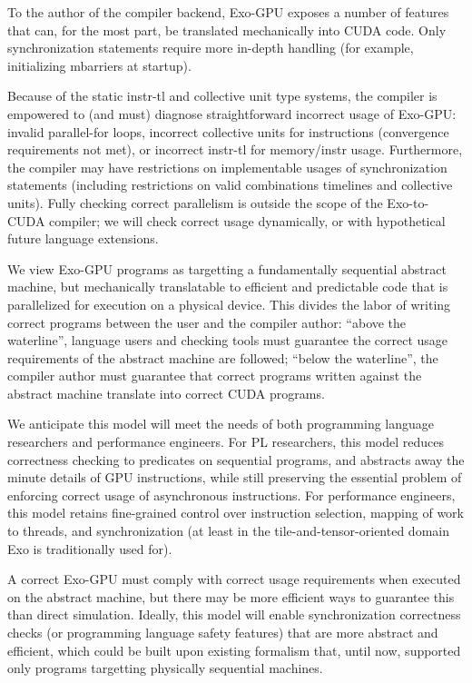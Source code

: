 \filbreak
{}

To the author of the compiler backend, Exo-GPU exposes a number of features that can, for the most part, be translated mechanically into CUDA code.
Only synchronization statements require more in-depth handling (for example, initializing mbarriers at startup).

\filbreak
Because of the static instr-tl and collective unit type systems, the compiler is empowered to (and must) diagnose straightforward incorrect usage of Exo-GPU: invalid parallel-for loops, incorrect collective units for instructions (convergence requirements not met), or incorrect instr-tl for memory/instr usage.
Furthermore, the compiler may have restrictions on implementable usages of synchronization statements (including restrictions on valid combinations timelines and collective units).
Fully checking correct parallelism is outside the scope of the Exo-to-CUDA compiler; we will check correct usage dynamically, or with hypothetical future language extensions.

\filbreak
{}

We view Exo-GPU programs as targetting a fundamentally sequential abstract machine, but mechanically translatable to efficient and predictable code that is parallelized for execution on a physical device.
This divides the labor of writing correct programs between the user and the compiler author: ``above the waterline'', language users and checking tools must guarantee the correct usage requirements of the abstract machine are followed; ``below the waterline'', the compiler author must guarantee that correct programs written against the abstract machine translate into correct CUDA programs.

\filbreak
We anticipate this model will meet the needs of both programming language researchers and performance engineers.
For PL researchers, this model reduces correctness checking to predicates on sequential programs, and abstracts away the minute details of GPU instructions, while still preserving the essential problem of enforcing correct usage of asynchronous instructions.
For performance engineers, this model retains fine-grained control over instruction selection, mapping of work to threads, and synchronization (at least in the tile-and-tensor-oriented domain Exo is traditionally used for).

\filbreak
A correct Exo-GPU must comply with correct usage requirements when executed on the abstract machine, but there may be more efficient ways to guarantee this than direct simulation.
Ideally, this model will enable synchronization correctness checks (or programming language safety features) that are more abstract and efficient, which could be built upon existing formalism that, until now, supported only programs targetting physically sequential machines.

